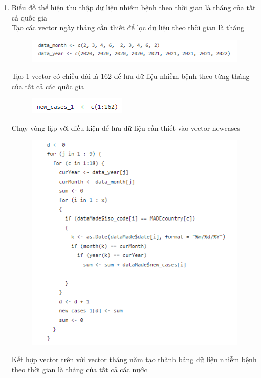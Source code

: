\documentclass[a4paper]{article}
\theoremstyle{definition}
\begin{document}
\begin{enumerate}[i)]
		\begin{enumerate}[1]
			\item Biểu đồ thể hiện thu thập dữ liệu nhiễm bệnh theo thời gian là tháng của tất cả quốc gia\\
			Tạo các vector ngày tháng cần thiết để lọc dữ liệu theo thời gian là tháng
			\begin{figure}[H]
				\centering
				\includegraphics{images/7.0.1.png}
			\end{figure}
			Tạo 1 vector có chiều dài là 162 để lưu dữ liệu nhiễm bệnh theo từng tháng của tất cả các quốc gia
			\begin{figure}[H]
				\centering
				\includegraphics{images/7.0.2.png}
			\end{figure}
			Chạy vòng lặp với điều kiện để lưu dữ liệu cần thiết vào vector newcases
			\begin{figure}[H]
				\centering
				\includegraphics{images/7.0.3.png}
			\end{figure}
			Kết hợp vector trên với vector tháng năm tạo thành bảng dữ liệu nhiễm bệnh theo thời gian là tháng của tất cả các nước
			\begin{figure}[H]

\end{figure}
\end{enumerate}
\end{enumerate}
\end{document}
